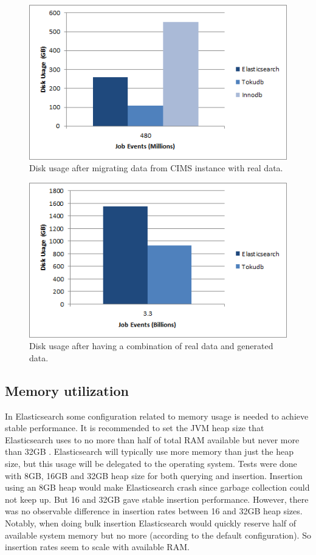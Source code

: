 \begin{figure}[h!]
\centering
\includegraphics[scale=0.78]{figure/disksmall.png}
\caption{Disk usage after migrating data from CIMS instance with real data.}
\label{fig:disc}
\end{figure}

\begin{figure}[h!]
\centering
\includegraphics[scale=0.78]{figure/diskbig.png}
\caption{Disk usage after having a combination of real data and generated data.}
\label{fig:discbig}
\end{figure}

\subsection{Memory utilization}

In Elasticsearch some configuration related to memory usage is needed to achieve stable performance. It is recommended to set the JVM heap size that Elasticsearch uses to no more than half of total RAM available but never more than 32GB \cite{JVM, ESmemory}. Elasticsearch will typically use more memory than just the heap size, but this usage will be delegated to the operating system. Tests were done with 8GB, 16GB and 32GB heap size for both querying and insertion. Insertion using an 8GB heap would make Elasticsearch crash since garbage collection could not keep up. But 16 and 32GB gave stable insertion performance. However, there was no observable difference in insertion rates between 16 and 32GB heap sizes. Notably, when doing bulk insertion Elasticsearch would quickly reserve half of available system memory but no more (according to the default configuration). So insertion rates seem to scale with available RAM.

